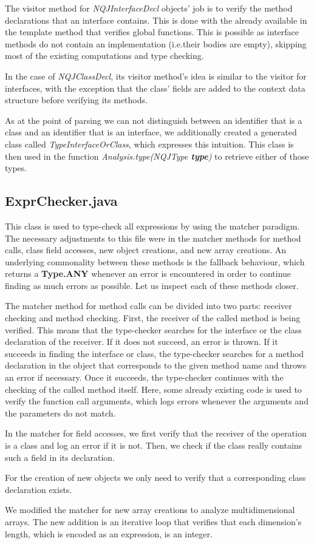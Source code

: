 The visitor method for \textit{NQJInterfaceDecl} objects' job is to
verify the method declarations that an interface contains.
This is done with the already available in the template method that verifies global functions.
This is possible as interface methods do not contain an implementation (i.e.\@ their bodies are empty),
skipping most of the existing computations and type checking.

In the case of \textit{NQJClassDecl}, its visitor method's idea is similar to the 
visitor for interfaces, with the exception that the class' fields are added
to the context data structure before verifying its methods.

As at the point of parsing we can not distinguish between an identifier that
is a class and an identifier that is an interface, we additionally created
a generated class called \textit{TypeInterfaceOrClass}, which expresses
this intuition. 
This class is then used in the function \textit{Analysis.type(NQJType \textbf{type})}
to retrieve either of those types.

\subsection{ExprChecker.java}
This class is used to type-check all expressions by using the matcher paradigm. 
The necessary adjustments to this file were in the matcher methods for
method calls, class field accesses, new object creations, and new array creations.
An underlying commonality between these methods is the fallback behaviour, which
returns a \textbf{Type.ANY} whenever an error is encountered in order to continue 
finding as much errors as possible.
Let us inspect each of these methods closer.

The matcher method for method calls can be divided into two
parts: receiver checking and method checking. First, the receiver of the called method is being verified. This means
that the type-checker searches for the interface or the class declaration of the receiver.
If it does not succeed, an error is thrown.
If it succeeds in finding the interface or class, the type-checker
searches for a method declaration in the object that corresponds to the given method name and throws an error
if necessary. Once it succeeds, the type-checker continues with the checking of the called method itself.
Here, some already existing code is used to verify the function call arguments,
which logs errors whenever the arguments and the parameters do not match. 

In the matcher for field accesses, we first verify that the receiver of the operation
is a class and log an error if it is not.
Then, we check if the class really contains such a field in its declaration.

For the creation of new objects we only need to verify that a corresponding
class declaration exists.

We modified the matcher for new array creations to analyze multidimensional arrays.
The new addition is an iterative loop that verifies
that each dimension's length, which is encoded as an expression, is an integer.